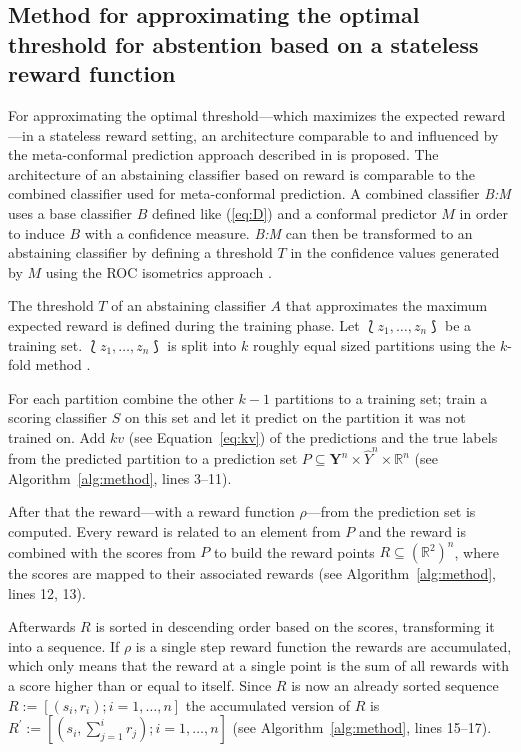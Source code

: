\documentclass[twoside,11pt]{article}
\def\ds{\Lbag z_1,\dots,z_n \Rbag}
\def\Y{\textbf{Y}}
\begin{document}
\subsection{Method for approximating the optimal threshold
  for abstention based on a stateless reward function}

For approximating the optimal threshold---which maximizes
the expected reward---in a stateless reward setting, an
architecture comparable to and influenced by the
meta-conform\-al prediction approach described in
\citet{smirnov_et_al_2009} is proposed.
The architecture of an abstaining classifier based on
reward is comparable to the combined classifier used for
meta-conformal prediction.
A combined classifier \textit{B:M} uses a base classifier
$B$ defined like (\ref{eq:D}) and a conformal predictor $M$
in order to induce $B$ with a confidence measure.
\textit{B:M} can then be transformed to an abstaining
classifier by defining a threshold $T$ in the confidence
values generated by $M$ using the ROC isometrics approach
\citep[see][]{smirnov_et_al_2009, vanderlooy_et_al_2009,
  fassbender2019}.

The threshold $T$ of an abstaining classifier $A$ that
approximates the maximum expected reward is defined during
the training phase.
Let $\ds$ be a training set.
$\ds$ is split into $k$ roughly equal sized partitions
using the $k$-fold method \citep[see][Chapter 7.10;
Algorithm~\ref{alg:method}, line 2]{hastie_et_al_2009}.

For each partition combine the other $k-1$ partitions to a
training set; train a scoring classifier $S$ on this
set and let it predict on the partition it was not trained
on. Add $kv$ (see Equation~\ref{eq:kv}) of the
predictions and the true labels from the predicted
partition to a prediction set
$P \subseteq \Y^n \times \hat{Y}^n \times \mathbb{R}^n$
(see Algorithm~\ref{alg:method}, lines 3--11).

After that the reward---with a reward function
$\rho$---from the prediction set is computed.
Every reward is related to an element from $P$ and the
reward is combined with the scores from $P$ to build the
reward points $R \subseteq (\mathbb{R}^2)^n$, where the
scores are mapped to their associated rewards
(see Algorithm~\ref{alg:method}, lines 12, 13).

Afterwards $R$ is sorted in descending order based on the
scores, transforming it into a sequence.
If $\rho$ is a single step reward function the rewards
are accumulated, which only means that the reward at a
single point is the sum of all rewards with a score higher
than or equal to itself.
Since $R$ is now an already sorted sequence
$R := [(s_i, r_i); i=1,\dots,n]$ the accumulated version
of $R$ is
$R^\prime := [(s_i, \sum_{j=1}^{i} r_j); i=1,\dots,n]$
(see Algorithm~\ref{alg:method}, lines 15--17).
\end{document}

